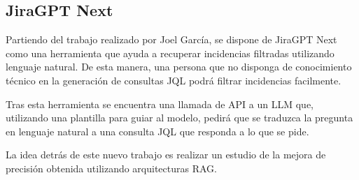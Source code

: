 \subsection{JiraGPT Next}
Partiendo del trabajo realizado por Joel García, se dispone de JiraGPT Next como una herramienta que ayuda a recuperar incidencias filtradas utilizando lenguaje natural. De esta manera, una persona que no disponga de conocimiento técnico en la generación de consultas JQL podrá filtrar incidencias facilmente.

Tras esta herramienta se encuentra una llamada de API a un LLM que, utilizando una plantilla para guiar al modelo, pedirá que se traduzca la pregunta en lenguaje natural a una consulta JQL que responda a lo que se pide.

La idea detrás de este nuevo trabajo es realizar un estudio de la mejora de precisión obtenida utilizando arquitecturas RAG.
